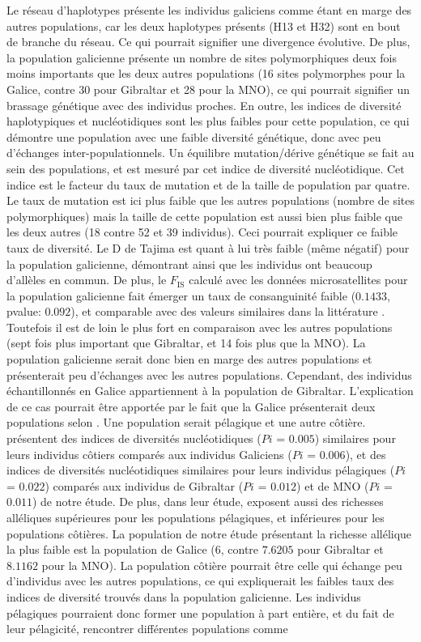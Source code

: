\documentclass[a4paper,12pt,twoside]{article}\usepackage[]{graphicx}\usepackage[]{color}
\begin{document}
\begin {bibunit} [newbst]
{Le réseau d'haplotypes présente les individus galiciens comme étant en marge des autres populations, car les deux haplotypes présents (H13 et H32) sont en bout de branche du réseau. Ce qui pourrait signifier une divergence évolutive. De plus, la population galicienne présente un nombre de sites polymorphiques deux fois moins importants que les deux autres populations (16 sites polymorphes pour la Galice, contre 30 pour Gibraltar et 28 pour la MNO), ce qui pourrait signifier un brassage génétique avec des individus proches. En outre, les indices de diversité haplotypiques et nucléotidiques sont les plus faibles pour cette population, ce qui démontre une population avec une faible diversité génétique, donc avec peu d'échanges inter-populationnels. Un équilibre mutation/dérive génétique se fait au sein des populations, et est mesuré par cet indice de diversité nucléotidique. Cet indice est le facteur du taux de mutation et de la taille de population par quatre. Le taux de mutation est ici plus faible que les autres populations (nombre de sites polymorphiques) mais la taille de cette population est aussi bien plus faible que les deux autres (18 contre 52 et 39 individus). Ceci pourrait expliquer ce faible taux de diversité. Le D de Tajima est quant à lui très faible (même négatif) pour la population galicienne, démontrant ainsi que les individus ont beaucoup d'allèles en commun. De plus, le $F_\textrm{IS}$ calculé avec les données microsatellites pour la population galicienne fait émerger un taux de consanguinité faible ($0.1433$, pvalue: $0.092$), et comparable avec des valeurs similaires dans la littérature \citep{louis2014, phdLouis2014}. Toutefois il est de loin le plus fort en comparaison avec les autres populations (sept fois plus important que Gibraltar, et 14 fois plus que la MNO). La population galicienne serait donc bien en marge des autres populations et présenterait peu d'échanges avec les autres populations. Cependant, des individus échantillonnés en Galice appartiennent à la population de Gibraltar. L'explication de ce cas pourrait être apportée par le fait que la Galice présenterait deux populations selon \citet{louis2014}. Une population serait pélagique et une autre côtière. \citet{lowther2014} présentent des indices de diversités nucléotidiques ($Pi$ = $0.005$) similaires pour leurs individus côtiers comparés aux individus Galiciens ($Pi$ = $0.006$), et des indices de diversités nucléotidiques similaires pour leurs individus pélagiques ($Pi$ = $0.022$) comparés aux individus de Gibraltar ($Pi$ = $0.012$) et de MNO ($Pi$ = $0.011$) de notre étude. De plus, dans leur étude, \citet{lowther2014} exposent aussi des richesses alléliques supérieures pour les populations pélagiques, et inférieures pour les populations côtières. La population de notre étude présentant la richesse allélique la plus faible est la population de Galice ($6$, contre $7.6205$ pour Gibraltar et $8.1162$ pour la MNO). La population côtière pourrait être celle qui échange peu d'individus avec les autres populations, ce qui expliquerait les faibles taux des indices de diversité trouvés dans la population galicienne. Les individus pélagiques pourraient donc former une population à part entière, et du fait de leur pélagicité, rencontrer différentes populations comme }
\end{bibunit}
\end{document}
